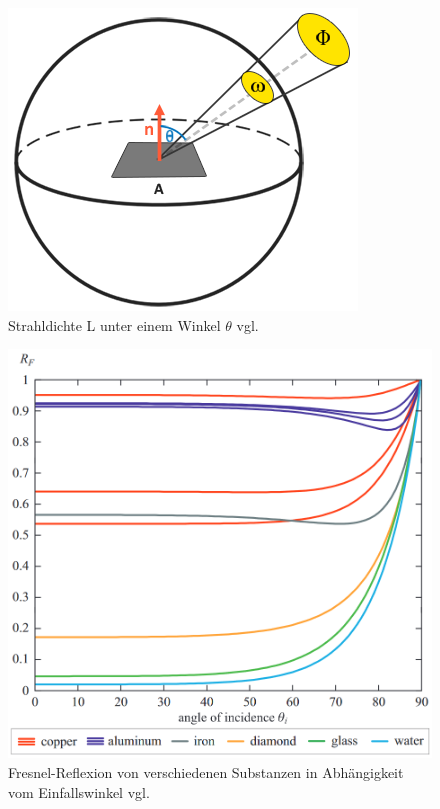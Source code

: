 \documentclass[
  11pt,
  a4paper,
  oneside
  ]{article}
\begin{document}
\begin{figure}[H]
  \centering
  \includegraphics*[width=0.9 \textwidth]{images/radiance.png}
  \caption{Strahldichte L unter einem Winkel $\theta$ vgl. \cite{learnOpenGL}}
  \label{fig:img4}
\end{figure}
\begin{figure}[H]
  \centering
  \includegraphics*[width=0.9 \textwidth]{images/fresnelDiagram.png}
  \caption{Fresnel-Reflexion von verschiedenen Substanzen in Abhängigkeit vom Einfallswinkel vgl. \cite{learnOpenGL}}
  \label{fig:img5}
\end{figure}
\end{document}
